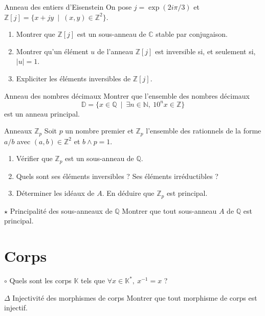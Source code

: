 \documentclass[french,a4paper]{article}
\newcommand{\N}{\mathbb{N}}
\newcommand{\Z}{\mathbb{Z}}
\newcommand{\Q}{\mathbb{Q}}
\newcommand{\C}{\mathbb{C}}
\newcommand{\K}{\mathbb{K}}
\newcommand{\st}{^*}
\newcommand{\inv}{^{-1}}
\theoremstyle{plain}
\theoremstyle{definition}
\theoremstyle{remark}
\begin{document}
\begin{ex}{Anneau des entiers d'Eisenstein}
	On pose $j=\exp\left(2i\pi/3\right)$ et $\Z[j]=\{x+jy\ \mid\ (x,y)\in\Z^2\}$.
	\begin{enumerate}
		\item Montrer que $\Z[j]$ est un sous-anneau de $\C$ stable par conjugaison.
		\item Montrer qu'un élément $u$ de l'anneau $\Z[j]$ est inversible si, et seulement si, $\lvert u\rvert=1$.
		\item Expliciter les éléments inversibles de $\Z[j]$.
	\end{enumerate}
\end{ex}

\begin{ex}[Moulin.41]{Anneau des nombres décimaux}
	Montrer que l'ensemble des nombres décimaux $$\mathbb{D}=\{x\in\Q\ \mid \ \exists n\in\N,\ 10^nx\in\Z\}$$ est un anneau principal.
\end{ex}

\begin{ex}[Moulin.42]{Anneaux $\Z_p$}
	Soit $p$ un nombre premier et $\Z_p$ l'ensemble des rationnels de la forme $a/b$ avec $(a,b)\in\Z^2$ et $b\wedge p=1$.
	\begin{enumerate}
		\item Vérifier que $\Z_p$ est un sous-anneau de $\Q$.
		\item Quels sont ses éléments inversibles ? Ses éléments irréductibles ?
		\item Déterminer les idéaux de $A$. En déduire que $\Z_p$ est principal.
	\end{enumerate}
\end{ex}

\begin{ex}{$\star$ Principalité des sous-anneaux de $\Q$}
	Montrer que tout sous-anneau $A$ de $\Q$ est principal.
\end{ex}

\section{Corps}

\begin{ex}[Moulin.43]{$\circ$}
	Quels sont les corps $\K$ tels que $\forall x\in\K\st,\ x\inv=x$ ?
\end{ex}

\begin{ex}[Morlot]{$\Delta$ Injectivité des morphismes de corps}
	Montrer que tout morphisme de corps est injectif.
\end{ex}
\end{document}
